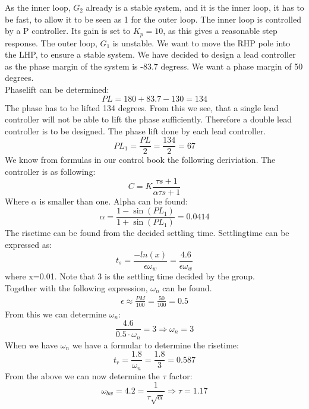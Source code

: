 As the inner loop, $G_2$ already is a stable system, and it is the inner loop, it has to be fast, to allow it to be seen as 1 for the outer loop. The inner loop is controlled by a P controller. Its gain is set to $K_p=10$, as this gives a reasonable step response. \newpar
The outer loop, $G_1$ is unstable. We want to move the RHP pole into the LHP, to ensure a stable system. We have decided to design a lead controller as the phase margin of the system is -83.7 degress. We want a phase margin of 50 degrees. \\
Phaselift can be determined:
\begin{equation}
PL=180+83.7-130=134
\end{equation}
The phase has to be lifted 134 degrees. From this we see, that a single lead controller will not be able to lift the phase sufficiently. Therefore a double lead controller is to be designed. 
The phase lift done by each lead controller. 
\begin{equation}
PL_1=\frac{PL}{2}=\frac{134}{2}=67
\end{equation}
We know from formulas in our control book the following deriviation. The controller is as following:
\begin{equation}
C=K\frac{\tau s +1}{\alpha \tau s +1}
\end{equation}
Where $\alpha$ is smaller than one. 
Alpha can be found: 
\begin{equation}
\alpha=\frac{1-\sin(PL_1)}{1+\sin(PL_1)}=0.0414
\end{equation}
The risetime can be found from the decided settling time. Settlingtime can be expressed as:
\begin{equation}
t_s=\frac{-ln(x)}{\epsilon \omega_w}=\frac{4.6}{\epsilon \omega_w}
\end{equation}
where x=0.01. Note that 3 is the settling time decided by the group. \\
Together with the following expression, $\omega_n$ can be found.
\begin{align}
\epsilon\approx \frac{PM}{100}=\frac{50}{100}=0.5
\end{align}
From this we can determine $\omega_n$:
\begin{equation}
\frac{4.6}{0.5\cdot \omega_n}=3 \Rightarrow \omega_n=3
\end{equation}
When we have $\omega_n$ we have a formular to determine the risetime:
\begin{equation}
t_r=\frac{1.8}{\omega_n}=\frac{1.8}{3}=0.587
\end{equation}
From the above we can now determine the $\tau$ factor:
\begin{equation}
\omega_{bw}=4.2=\frac{1}{\tau \sqrt{\alpha}}\Rightarrow \tau=1.17
\end{equation}
 
